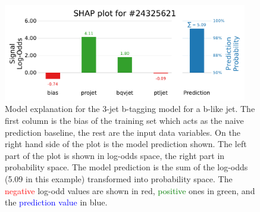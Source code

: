 \begin{figure}
  \includegraphics[width=0.95\textwidth, trim=0 0 0 40, clip]{figures/quarks/shap_values-down_sample=1.00-ML_vars=vertex-selection=b-ejet_min=4-n_iter_RS_lgb=99-n_iter_RS_xgb=9-cdot_cut=0.90-version=19-njet=3loc=24325621.pdf}
  \caption[SHAP Prediction Explanation for b-like jet]
          {Model explanation for the 3-jet b-tagging model for a b-like jet. The first column is the bias of the training set which acts as the naive prediction baseline, the rest are the input data variables. On the right hand side of the plot is the model prediction shown. The left part of the plot is shown in log-odds space, the right part in probability space. The model prediction is the sum of the log-odds (5.09 in this example) transformed into probability space. The \textcolor{red}{negative} log-odd values are shown in red, \textcolor{green}{positive} ones in green, and the \textcolor{blue}{prediction value} in blue. 
          } 
  \label{fig:q:shap_signal}
\end{figure}


